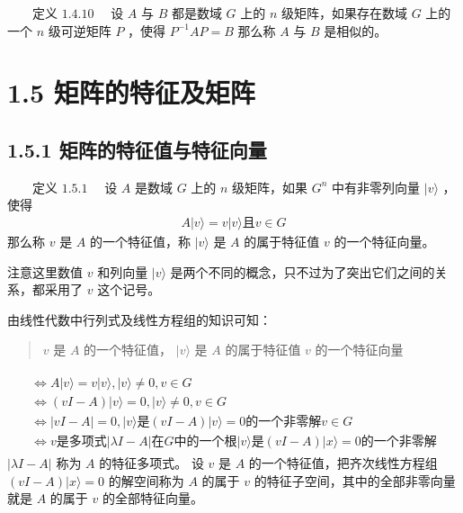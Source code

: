 \documentclass[a4paper,11pt,english]{sphinxmanual}
\begin{document}
\sphinxAtStartPar
​  定义 \(1.4.10\)   设  \(A\)  与  \(B\)  都是数域  \(G\)  上的  \(n\)  级矩阵，如果存在数域  \(G\)  上的一个  \(n\)  级可逆矩阵  \(P\)  ，使得  \(P^{-1} A P=B\)  那么称  \(A\)  与  \(B\)  是相似的。

\sphinxstepscope


\section{1.5 矩阵的特征及矩阵}
\label{\detokenize{rst/_u9644_u5f551_u91cf_u5b50_u8ba1_u7b97_u6570_u5b66_u57fa_u78404:id1}}\label{\detokenize{rst/_u9644_u5f551_u91cf_u5b50_u8ba1_u7b97_u6570_u5b66_u57fa_u78404::doc}}

\subsection{1.5.1 矩阵的特征值与特征向量}
\label{\detokenize{rst/_u9644_u5f551_u91cf_u5b50_u8ba1_u7b97_u6570_u5b66_u57fa_u78404:id2}}
\sphinxAtStartPar
​  定义  \(1.5.1\)  设 \(A\) 是数域  \(G\) 上的  \(n\) 级矩阵，如果  \(G^n\) 中有非零列向量 \(| {v}\rangle\) ，使得
\begin{equation*}
\begin{split}A|v\rangle=v|v\rangle\text{且}v \in G\end{split}
\end{equation*}
\sphinxAtStartPar
那么称 \(v\) 是 \(A\) 的一个特征值，称 \(| {v}\rangle\) 是 \(A\) 的属于特征值 \(v\) 的一个特征向量。

\sphinxAtStartPar
注意这里数值 \(v\) 和列向量 \(| {v}\rangle\) 是两个不同的概念，只不过为了突出它们之间的关系，都采用了 \(v\) 这个记号。

\sphinxAtStartPar
由线性代数中行列式及线性方程组的知识可知：
\begin{quote}

\sphinxAtStartPar
\(v\) 是 \(A\) 的一个特征值， \(| {v}\rangle\) 是 \(A\) 的属于特征值 \(v\) 的一个特征向量
\end{quote}
\begin{equation*}
\begin{split}\begin{aligned} &\Leftrightarrow A|v\rangle=v|v\rangle,|v\rangle \neq 0, v \in G \\ &\Leftrightarrow(v I-A)|v\rangle=0,|v\rangle \neq 0, v \in G \\ &\Leftrightarrow|v I-A|=0 , |v\rangle \text {是} (v I-A)|v\rangle=0 \text {的一个非零解} v \in G \\ &\Leftrightarrow v \text {是多项式} |\lambda I-A| \text {在} G \text{中的一个根}|v\rangle \text{是} (v I-A)|x\rangle=0 \text{的一个非零解}& \end{aligned}\end{split}
\end{equation*}
\sphinxAtStartPar
\(|\lambda I-A|\) 称为  \(A\) 的特征多项式。 设  \({v}\) 是  \(A\) 的一个特征值，把齐次线性方程组  \((v I-A)|x\rangle=0\) 的解空间称为  \(A\) 的属于  \(v\) 的特征子空间，其中的全部非零向量就是  \(A\) 的属于  \(v\) 的全部特征向量。
\end{document}
